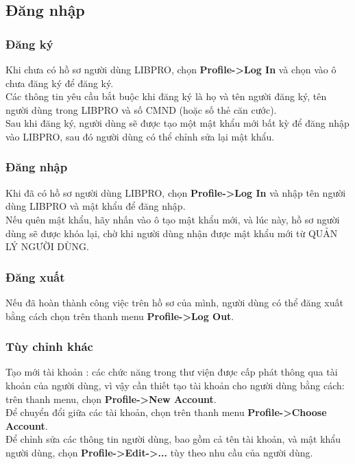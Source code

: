 \documentclass[12pt,a4paper]{report}
\begin{document}
        \subsection{Đăng nhập}
            \subsubsection{Đăng ký}
            Khi chưa có hồ sơ người dùng LIBPRO, chọn \textbf{Profile->Log In} và chọn vào ô chưa đăng ký để đăng ký.\\
            Các thông tin yêu cầu bắt buộc khi đăng ký là họ và tên người đăng ký, tên người dùng trong LIBPRO và số CMND (hoặc số thẻ căn cước).\\
            Sau khi đăng ký, người dùng sẽ được tạo một mật khẩu mới bất kỳ để đăng nhập vào LIBPRO, sau đó người dùng có thể chỉnh sửa lại mật khẩu.\\
            \subsubsection{Đăng nhập}
            Khi đã có hồ sơ người dùng LIBPRO, chọn \textbf{Profile->Log In} và nhập tên người dùng LIBPRO và mật khẩu để đăng nhập.\\
            Nếu quên mật khẩu, hãy nhấn vào ô tạo mật khẩu mới, và lúc này, hồ sơ người dùng sẽ được khóa lại, chờ khi người dùng nhận được mật khẩu mới từ QUẢN LÝ NGƯỜI DÙNG.\\
            \subsubsection{Đăng xuất}
            Nếu đã hoàn thành công việc trên hồ sơ của mình, người dùng có thể đăng xuất bằng cách chọn trên thanh menu \textbf{Profile->Log Out}.\\
            \subsubsection{Tùy chỉnh khác}
            Tạo mới tài khoản : các chức năng trong thư viện được cấp phát thông qua tài khoản của người dùng, vì vậy cần thiết tạo tài khoản cho người dùng bằng cách: trên thanh menu, chọn \textbf{Profile->New Account}.\\
            Để chuyển đổi giữa các tài khoản, chọn trên thanh menu \textbf{Profile->Choose Account}.\\
            Để chỉnh sửa các thông tin người dùng, bao gồm cả tên tài khoản, và mật khẩu người dùng, chọn \textbf{Profile->Edit->...} tùy theo nhu cầu của người dùng.\\
\end{document}
